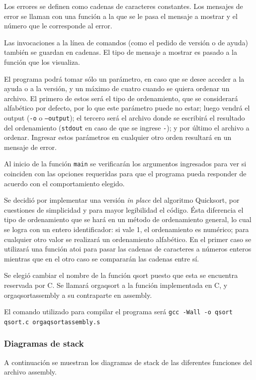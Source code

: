 \documentclass[a4paper, 12pt]{article}
\begin{document}
		Los errores se definen como cadenas de caracteres constantes. Los mensajes de error se llaman con una función a la que se le pasa el mensaje a mostrar y el número que le corresponde al error.
		
		Las invocaciones a la línea de comandos (como el pedido de versión o de ayuda) también se guardan en cadenas. El tipo de mensaje a mostrar es pasado a la función que los visualiza.
		
		El programa podrá tomar sólo un parámetro, en caso que se desee acceder a la ayuda o a la versión, y un máximo de cuatro cuando se quiera ordenar un archivo. El primero de estos será el tipo de ordenamiento, que se considerará alfabético por defecto, por lo que este parámetro puede no estar; luego vendrá el output (\texttt{-o} o \texttt{--output}); el tercero será el archivo donde se escribirá el resultado del ordenamiento (\texttt{stdout} en caso de que se ingrese \texttt{-}); y por último el archivo a ordenar. Ingresar estos parámetros en cualquier otro orden resultará en un mensaje de error.
		
		Al inicio de la función \texttt{main} se verificarán los argumentos ingresados para ver si coinciden con las opciones requeridas para que el programa pueda responder de acuerdo con el comportamiento elegido.
		
		Se decidió por implementar una versión \textit{in place} del algoritmo Quicksort, por cuestiones de simplicidad y para mayor legibilidad el código. Ésta diferencia el tipo de ordenamiento que se hará en un método de ordenamiento general, lo cual se logra con un entero identificador: si vale 1, el ordenamiento es numérico; para cualquier otro valor se realizará un ordenamiento alfabético. En el primer caso se utilizará una función atoi para pasar las cadenas de caracteres a números enteros mientras que en el otro caso se compararán las cadenas entre sí. 
		
		Se elegió cambiar el nombre de la función qsort puesto que esta se encuentra reservada por C. Se llamará orgaqsort a la función implementada en C, y orgaqsortassembly a su contraparte en assembly.
		
		El comando utilizado para compilar el programa será \texttt{gcc -Wall -o qsort qsort.c orgaqsortassembly.s} 
	\subsubsection{Diagramas de stack}
		A continuación se muestran los diagramas de stack de las diferentes funciones del archivo assembly.
			
\end{document}
